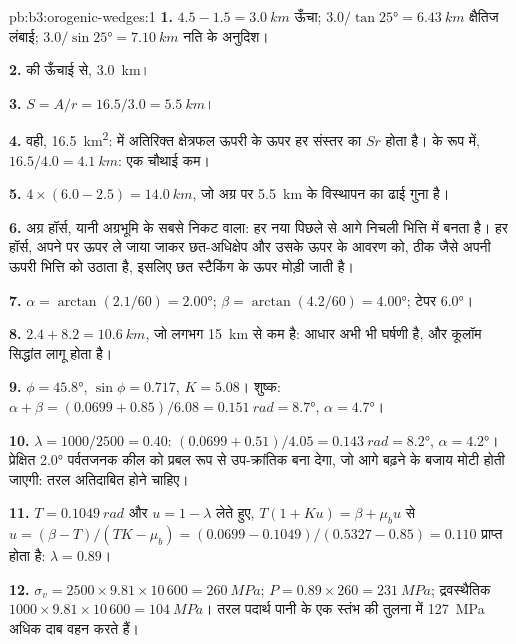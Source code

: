 \begin{solution}{pb:b3:orogenic-wedges:1}
\textbf{1.} $4.5 - 1.5 = \qty{3.0}{km}$ ऊँचा; $3.0/\tan\ang{25} =
\qty{6.43}{km}$ क्षैतिज लंबाई; $3.0/\sin\ang{25} = \qty{7.10}{km}$ नति
के अनुदिश।

\textbf{2.}  की ऊँचाई से, \qty{3.0}{km}।

\textbf{3.} $S = A/r = 16.5/3.0 = \qty{5.5}{km}$।

\textbf{4.} वही, \qty{16.5}{km^2}:  में अतिरिक्त क्षेत्रफल
ऊपरी  के ऊपर हर संस्तर का $Sr$ होता है।  के रूप में, $16.5/4.0 =
\qty{4.1}{km}$: एक चौथाई कम।

\textbf{5.} $4\times(6.0 - 2.5) = \qty{14.0}{km}$, जो अग्र  पर
\qty{5.5}{km} के विस्थापन का ढाई गुना है।

\textbf{6.} अग्र हॉर्स, यानी अग्रभूमि के सबसे निकट वाला: हर नया 
पिछले से आगे निचली भित्ति में बनता है। हर हॉर्स, अपने  पर
ऊपर ले जाया जाकर छत-अधिक्षेप और उसके ऊपर के आवरण को, ठीक जैसे 
अपनी ऊपरी भित्ति को उठाता है, इसलिए छत स्टैकिंग के ऊपर मोड़ी जाती है।

\textbf{7.} $\alpha = \arctan(2.1/60) = \ang{2.00}$; $\beta =
\arctan(4.2/60) = \ang{4.00}$; टेपर \ang{6.0}।

\textbf{8.} $2.4 + 8.2 = \qty{10.6}{km}$, जो लगभग \qty{15}{km} से कम है: आधार
अभी भी घर्षणी है, और कूलॉम सिद्धांत लागू होता है।

\textbf{9.} $\phi = \ang{45.8}$, $\sin\phi = 0.717$, $K = 5.08$। शुष्क:
$\alpha + \beta = (0.0699 + 0.85)/6.08 = \qty{0.151}{rad} = \ang{8.7}$,
$\alpha = \ang{4.7}$।

\textbf{10.} $\lambda = 1000/2500 = 0.40$: $(0.0699 + 0.51)/4.05 =
\qty{0.143}{rad} = \ang{8.2}$, $\alpha = \ang{4.2}$। प्रेक्षित \ang{2.0}
पर्वतजनक कील को प्रबल रूप से उप-क्रांतिक बना देगा, जो आगे बढ़ने के बजाय
मोटी होती जाएगी: तरल अतिदाबित होने चाहिए।

\textbf{11.} $T = \qty{0.1049}{rad}$ और $u = 1 - \lambda$ लेते हुए, $T(1 + Ku) =
\beta + \mu_bu$ से $u = (\beta - T)/(TK - \mu_b) = (0.0699 -
0.1049)/(0.5327 - 0.85) = 0.110$ प्राप्त होता है: $\lambda = 0.89$।

\textbf{12.} $\sigma_v = 2500\times9.81\times10\,600 = \qty{260}{MPa}$; $P =
0.89\times260 = \qty{231}{MPa}$; द्रवस्थैतिक $1000\times9.81\times10\,600 =
\qty{104}{MPa}$। तरल पदार्थ पानी के एक स्तंभ की तुलना में
\qty{127}{MPa} अधिक दाब वहन करते हैं।


\end{solution}
